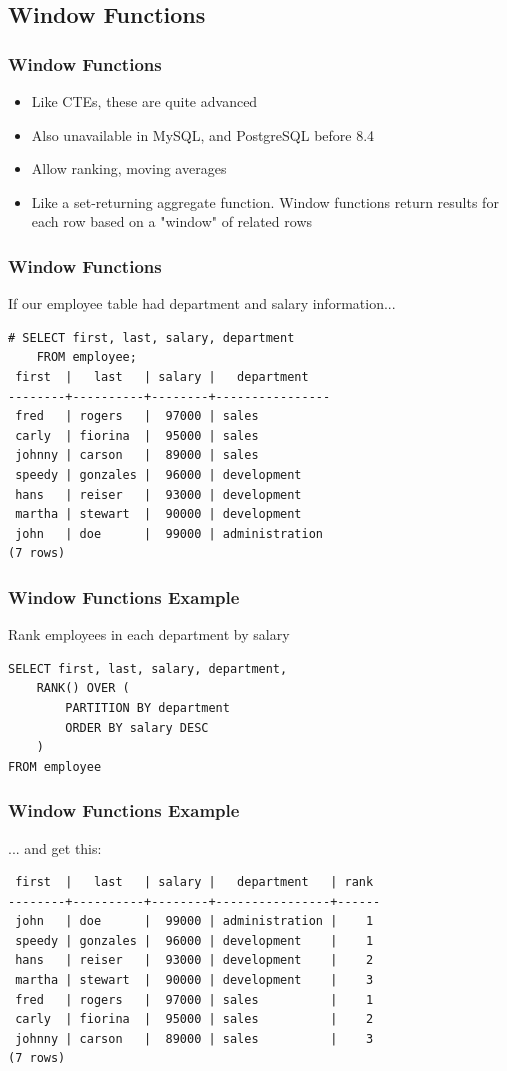 \documentclass{beamer}
\begin{document}
\subsection{Window Functions}
\begin{frame}
    \frametitle{Window Functions}
    \begin{itemize}
        \item Like CTEs, these are quite advanced
        \pause
        \item Also unavailable in MySQL, and PostgreSQL before 8.4
        \pause
        \item Allow ranking, moving averages
        \pause
        \item Like a set-returning aggregate function. Window functions return results for each row based on a "window" of related rows
    \end{itemize}
\end{frame}

\begin{frame}[fragile]
    \frametitle{Window Functions}
    If our employee table had department and salary information...
    \begin{verbatim}
# SELECT first, last, salary, department
    FROM employee;
 first  |   last   | salary |   department
--------+----------+--------+----------------
 fred   | rogers   |  97000 | sales
 carly  | fiorina  |  95000 | sales
 johnny | carson   |  89000 | sales
 speedy | gonzales |  96000 | development
 hans   | reiser   |  93000 | development
 martha | stewart  |  90000 | development
 john   | doe      |  99000 | administration
(7 rows)
    \end{verbatim}
\end{frame}

\begin{frame}[fragile]
    \frametitle{Window Functions Example}
    Rank employees in each department by salary
    \begin{verbatim}
SELECT first, last, salary, department,
    RANK() OVER (
        PARTITION BY department
        ORDER BY salary DESC
    )
FROM employee
    \end{verbatim}
\end{frame}

\begin{frame}[fragile]
    \frametitle{Window Functions Example}
    ... and get this:
    \footnotesize
    \begin{verbatim}
 first  |   last   | salary |   department   | rank
--------+----------+--------+----------------+------
 john   | doe      |  99000 | administration |    1
 speedy | gonzales |  96000 | development    |    1
 hans   | reiser   |  93000 | development    |    2
 martha | stewart  |  90000 | development    |    3
 fred   | rogers   |  97000 | sales          |    1
 carly  | fiorina  |  95000 | sales          |    2
 johnny | carson   |  89000 | sales          |    3
(7 rows)
    \end{verbatim}
    \normalsize
\end{frame}
\end{document}

